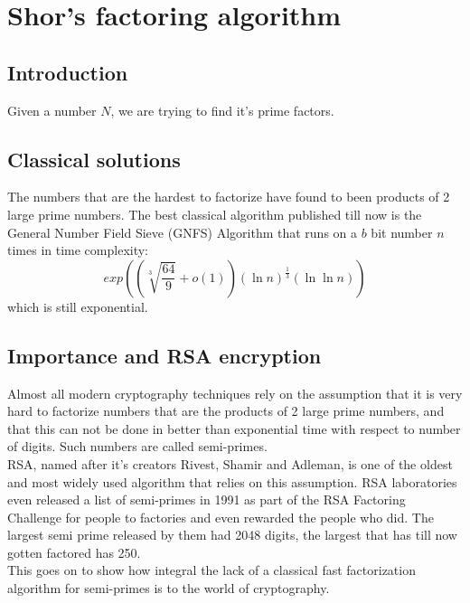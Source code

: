 \chapter{Shor's factoring algorithm}
\section{Introduction}
Given a number $N$, we are trying to find it's prime factors.

\section{Classical solutions}
The numbers that are the hardest to factorize have found to been products of 2 large prime numbers. The best classical algorithm published till now is the General Number Field Sieve (GNFS) Algorithm that runs on a $b$ bit number $n$ times in time complexity: 
\\
\begin{equation*}
    exp \left(\left(\sqrt[3]{\frac{64}{9}} + o(1)\right)\left(\ln{n}\right)^\frac{1}{3}\left(\ln{\ln{n}}\right)\right)
\end{equation*}
which is still exponential.

\section{Importance and RSA encryption}
Almost all modern cryptography techniques rely on the assumption that it is very hard to factorize numbers that are the products of 2 large prime numbers, and that this can not be done in better than exponential time with respect to number of digits. Such numbers are called semi-primes. \\
RSA, named after it's creators Rivest, Shamir and Adleman, is one of the oldest and most widely used algorithm that relies on this assumption. RSA laboratories even released a list of semi-primes in 1991 as part of the RSA Factoring Challenge for people to factories and even rewarded the people who did. The largest semi prime released by them had 2048 digits, the largest that has till now gotten factored has 250. \\
This goes on to show how integral the lack of a classical fast factorization algorithm for semi-primes is to the world of cryptography.

